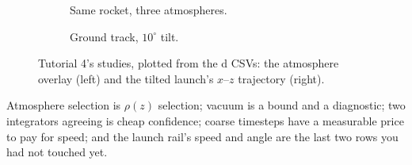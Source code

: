 \begin{figure}[htbp]\centering
\begin{subfigure}[b]{0.55\linewidth}\centering
{}
\caption{Same rocket, three atmospheres.}
\end{subfigure}\hfill
\begin{subfigure}[b]{0.42\linewidth}\centering
{}
\caption{Ground track, $10^\circ$ tilt.}
\end{subfigure}
\caption{Tutorial 4's studies, plotted from the d CSVs: the
atmosphere overlay (left) and the tilted launch's $x$--$z$ trajectory
(right).}
\label{fig:tut4-plots}
\end{figure}

\begin{tip}
Atmosphere selection is $\rho(z)$ selection; vacuum is a bound and a
diagnostic; two integrators agreeing is cheap confidence; coarse timesteps
have a measurable price to pay for speed; and the launch rail's speed and angle are the last
two  rows you had not touched yet.
\end{tip}
